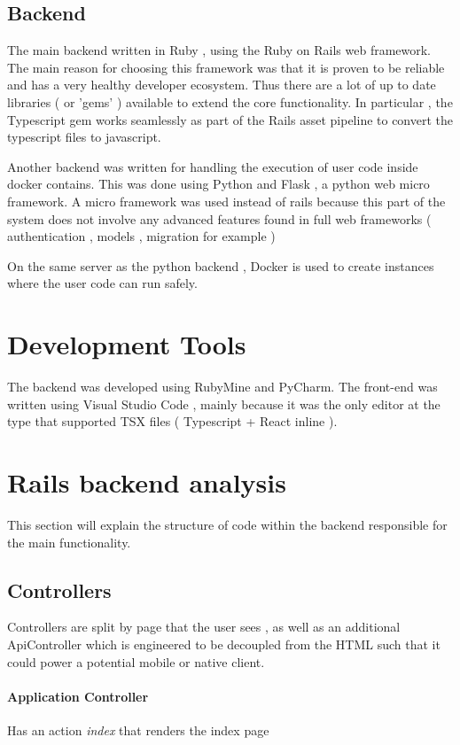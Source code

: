 \subsection{Backend} 
The main backend written in Ruby , using the Ruby on Rails web framework. The main reason for choosing this framework was that it is proven to be reliable and has a very healthy developer ecosystem. Thus there are a lot of up to date libraries ( or 'gems' ) available to extend the core functionality. In particular , the Typescript gem works seamlessly as part of the Rails asset pipeline to convert the typescript files to javascript.

Another backend was written for handling the execution of user code inside docker contains. This was done using Python and Flask , a python web micro framework. A micro framework was used instead of rails because this part of the system does not involve any advanced features found in full web frameworks ( authentication , models , migration for example )

On the same server as the python backend , Docker is used to create instances where the user code can run safely.

\section{Development Tools}
The backend was developed using RubyMine and PyCharm.
The front-end was written using Visual Studio Code , mainly because it was the only editor at the type that supported TSX files ( Typescript + React inline ).


\section{Rails backend analysis}
This section will explain the structure of code within the backend responsible for the main functionality.

\subsection{Controllers}
Controllers are split by page that the user sees , as well as an additional ApiController which is engineered to be decoupled from the HTML such that it could power a potential mobile or native client.

\paragraph{Application Controller}  Has an action \textit{index} that renders the index page
